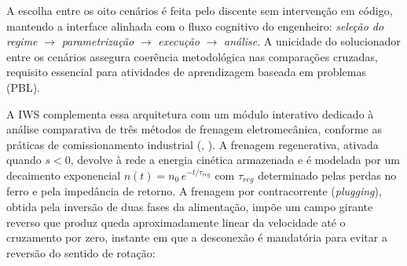 \documentclass[a4paper]{ifacconf}
\begin{document}
\begin{table}[htbp]
\centering
\caption{Cenários experimentais unificados na IWS.}
\label{tab:cenarios}
\end{table}

A escolha entre os oito cenários é feita pelo discente sem intervenção em código, mantendo a interface alinhada com o fluxo cognitivo do engenheiro: \textit{seleção do regime} $\rightarrow$ \textit{parametrização} $\rightarrow$ \textit{execução} $\rightarrow$ \textit{análise}. A unicidade do solucionador entre os cenários assegura coerência metodológica nas comparações cruzadas, requisito essencial para atividades de aprendizagem baseada em problemas (PBL).

A IWS complementa essa arquitetura com um módulo interativo dedicado à análise comparativa de três métodos de frenagem eletromecânica, conforme as práticas de comissionamento industrial (\citeauthor{ikeda2007simulation}, \citeyear{ikeda2007simulation}). A frenagem regenerativa, ativada quando $s < 0$, devolve à rede a energia cinética armazenada e é modelada por um decaimento exponencial $n(t) = n_0\,e^{-t/\tau_{reg}}$ com $\tau_{reg}$ determinado pelas perdas no ferro e pela impedância de retorno. A frenagem por contracorrente (\textit{plugging}), obtida pela inversão de duas fases da alimentação, impõe um campo girante reverso que produz queda aproximadamente linear da velocidade até o cruzamento por zero, instante em que a desconexão é mandatória para evitar a reversão do sentido de rotação:
\end{document}
